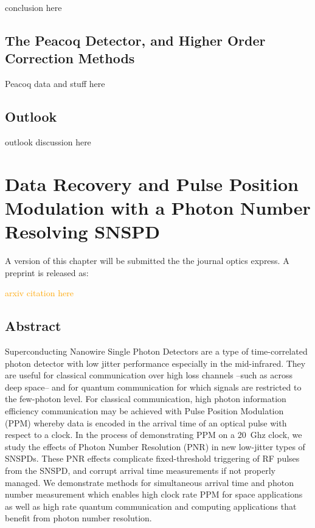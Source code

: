 \documentclass[11pt]{caltech_thesis} %
\begin{document}
conclusion here

\hypertarget{the-peacoq-detector-and-higher-order-correction-methods}{%
\section{The Peacoq Detector, and Higher Order Correction
Methods}\label{the-peacoq-detector-and-higher-order-correction-methods}}

Peacoq data and stuff here

{}

\hypertarget{outlook}{%
\section{Outlook}\label{outlook}}

outlook discussion here

\hypertarget{data-recovery-and-pulse-position-modulation-with-a-photon-number-resolving-snspd}{%
\chapter{Data Recovery and Pulse Position Modulation with a Photon
Number Resolving
SNSPD}\label{data-recovery-and-pulse-position-modulation-with-a-photon-number-resolving-snspd}}

A version of this chapter will be submitted the the journal optics
express. A preprint is released as:

\textcolor{orange}{arxiv citation here}

\hypertarget{abstract-2}{%
\section{Abstract}\label{abstract-2}}

Superconducting Nanowire Single Photon Detectors are a type of
time-correlated photon detector with low jitter performance especially
in the mid-infrared. They are useful for classical communication over
high loss channels --such as across deep space-- and for quantum
communication for which signals are restricted to the few-photon level.
For classical communication, high photon information efficiency
communication may be achieved with Pulse Position Modulation (PPM)
whereby data is encoded in the arrival time of an optical pulse with
respect to a clock. In the process of demonstrating PPM on a 20~Ghz
clock, we study the effects of Photon Number Resolution (PNR) in new
low-jitter types of SNSPDs. These PNR effects complicate fixed-threshold
triggering of RF pulses from the SNSPD, and corrupt arrival time
measurements if not properly managed. We demonstrate methods for
simultaneous arrival time and photon number measurement which enables
high clock rate PPM for space applications as well as high rate quantum
communication and computing applications that benefit from photon number
resolution.
\end{document}
